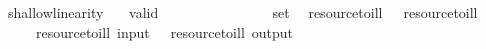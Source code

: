 \ shallow{\isacharunderscore}linearity{\isacharcolon}\isanewline
\ \ \ {\isachardoublequoteopen}valid\ \isanewline
\ \ \ \ \ \ \ \ \ {\isachardoublequoteopen}{\isasymforall}\isanewline
{}\ \ \ \ {\isasymin}\ set\ \isanewline
{}\ {\isacharbrackleft}resource{\isacharunderscore}to{\isacharunderscore}ill\ \ {\isasymturnstile}\ resource{\isacharunderscore}to{\isacharunderscore}ill\ \isanewline
\ \ \ \ \ {\isachardoublequoteopen}{\isacharbrackleft}resource{\isacharunderscore}to{\isacharunderscore}ill\ {\isacharparenleft}input\ \ {\isasymturnstile}\ resource{\isacharunderscore}to{\isacharunderscore}ill\ {\isacharparenleft}output\ 

